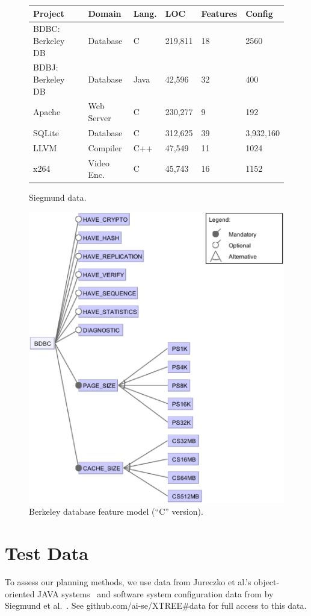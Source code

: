 \documentclass{sig-alternate}
\begin{document}
 \begin{figure}[!t]
\scriptsize
\begin{tabular}{llllll}
  \hline
  \rowcolor{lightgray}
Project & Domain & Lang. & LOC & Features & Config\\\hline
BDBC: Berkeley DB   & Database & C & 219,811 & 18 & 2560\\
BDBJ: Berkeley DB   & Database & Java & 42,596 & 32  & 400\\
Apache & Web Server & C & 230,277 & 9 & 192\\
SQLite & Database & C & 312,625 & 39 & 3,932,160\\
LLVM & Compiler & C++ & 47,549 & 11 & 1024\\
x264 & Video Enc. & C& 45,743 & 16 & 1152\\\hline
\end{tabular}
 
\caption{Siegmund data.}\label{fig:cpm}
\end{figure}

\begin{figure}[!t]
\includegraphics[width=0.9\linewidth]{figs/BDBC.eps}
\caption{ Berkeley database feature model   (``C'' version). }\label{fig:bdbc}
\end{figure}


 \section{Test Data}\label{sect:tesd}
To assess our planning methods, we use data from Jureczko et al.'s object-oriented JAVA systems~\cite{jureczko10}  and
  software system   configuration data from by  Siegmund et al.~\cite{sven12}.
  See github.com/ai-se/XTREE\#data for full access to this data.
  
\end{document}
